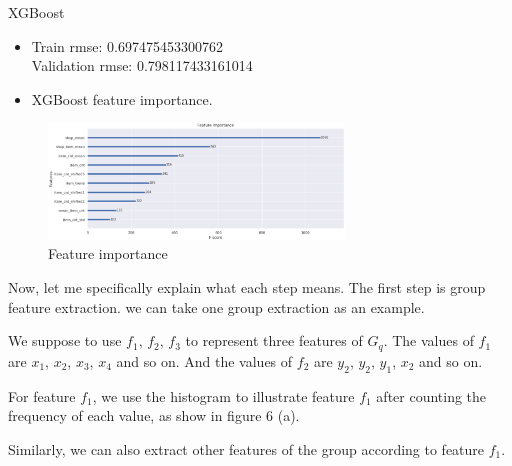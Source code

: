 \documentclass[
 size=14pt,
 paper=smartboard,  %
 mode=present, 		%
 display=slides, 	%
 style=tuliplab,  	%
 pauseslide,
 fleqn,leqno]{powerdot}
\begin{document}
\begin{slide}[toc=,bm=]{XGBoost}
  \begin{itemize}
  \item
  \smallskip
  Train rmse: 0.697475453300762\\
Validation rmse: 0.798117433161014
  \item
  XGBoost feature importance.
\end{itemize}
  
\begin{figure}
  \centering
  \includegraphics[width=0.7\textwidth,natwidth=1066,natheight=406]{figures/importance.eps}
  \caption{Feature importance}\label{Checking for outliers}
\end{figure}
  
  \begin{note}
  Now, let me specifically explain what each step means.
  The first step is group feature extraction.
  we can take one group extraction as an example.
  
  We suppose to use $f_1$, $f_2$, $f_3$ to represent three features of $G_q$.
  The values of $f_1$ are {$x_1$, $x_2$, $x_3$, $x_4$} and so on.
  And the values of $f_2$ are {$y_2$, $y_2$, $y_1$, $x_2$} and so on.
  
  For feature $f_1$,
  we use the histogram to illustrate feature $f_1$ after
  counting the frequency of each value,
  as show in figure 6 (a).
  
  Similarly,
  we can also extract other features of the group
  according to feature $f_1$.
  \end{note}
  
  \end{slide}
\end{document}
